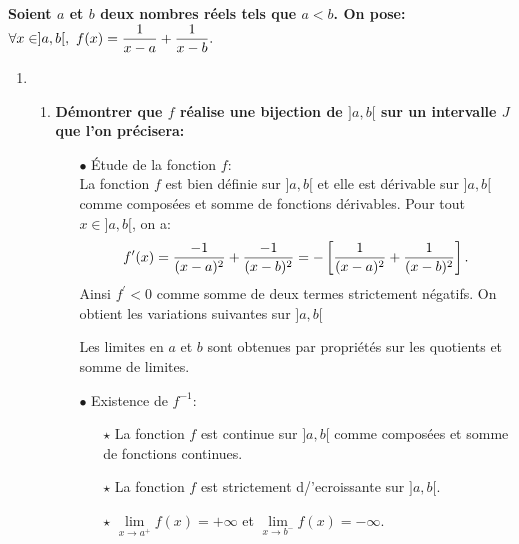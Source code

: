 \documentclass[a4paper, 11pt,reqno]{article}
\begin{document}
\begin{correction}  \;
	\textbf{Soient $a$ et $b$ deux nombres r\'eels tels que $a<b$. On pose: $\forall x\in\rbrack a,b\lbrack,\ f(x)=\ddp\frac{1}{x-a}+\ddp\frac{1}{x-b}.$}
	\begin{enumerate}
		\item
		      \begin{enumerate}
			      \item \textbf{D\'emontrer que $f$ r\'ealise une bijection de $\rbrack a,b\lbrack$ sur un intervalle $J$ que l'on pr\'ecisera:}
			            \begin{itemize}
				            \item[$\bullet$] \'Etude de la fonction $f$:\\
				                  \noindent La fonction $f$ est bien d\'efinie sur $\rbrack a,b\lbrack$ et elle est d\'erivable sur $\rbrack a,b\lbrack$ comme compos\'ees et somme de fonctions d\'erivables. Pour tout $x\in \rbrack a,b\lbrack$, on a:
				                  $$f^{\prime}(x)=\displaystyle\frac{-1}{(x-a)^2}+\displaystyle\frac{-1}{(x-b)^2}=-\left\lbrack  \displaystyle\frac{1}{(x-a)^2}+\displaystyle\frac{1}{(x-b)^2} \right\rbrack.$$
				                  Ainsi $f^{\prime}<0$ comme somme de deux termes strictement n\'egatifs. On obtient les variations suivantes sur $\rbrack a,b\lbrack$
				                  \begin{center}
				                  \end{center}
				                  Les limites en $a$ et $b$ sont obtenues par propri\'et\'es sur les quotients et somme de limites.
				            \item[$\bullet$] Existence de $f^{-1}$:
				                  \begin{itemize}
					                  \item[$\star$] La fonction $f$ est continue sur $\rbrack a,b\lbrack$ comme compos\'ees et somme de fonctions continues.
					                  \item[$\star$] La fonction $f$ est strictement d/'ecroissante sur $\rbrack a,b\lbrack$.
					                  \item[$\star$] $\lim\limits_{x\to a^+} f(x)=+\infty$ et $\lim\limits_{x\to b^-} f(x)=-\infty$.

\end{itemize}
\end{itemize}
\end{enumerate}
\end{enumerate}
\end{correction}
\end{document}
